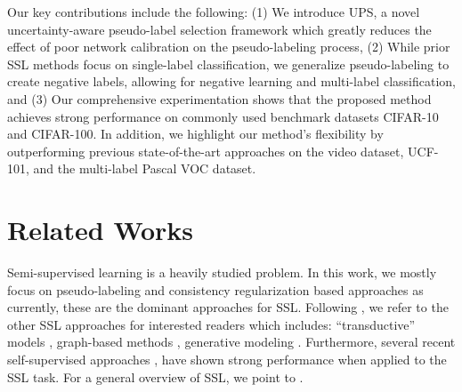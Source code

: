 \documentclass{article} \usepackage{iclr2021_conference,times}
\begin{document}
Our key contributions include the following: (1) We introduce UPS, a novel uncertainty-aware pseudo-label selection framework which greatly reduces the effect of poor network calibration on the pseudo-labeling process, (2) While prior SSL methods focus on single-label classification, we generalize pseudo-labeling to create negative labels, allowing for negative learning and multi-label classification, and (3) Our comprehensive experimentation shows that the proposed method achieves strong performance on commonly used benchmark datasets CIFAR-10 and CIFAR-100. In addition, we highlight our method's flexibility by outperforming previous state-of-the-art approaches on the video dataset, UCF-101, and the multi-label Pascal VOC dataset.  

\iffalse
Our key contributions include the following:
\begin{itemize}
  \item We introduce UPS, a novel uncertainty-aware pseudo-label selection framework which greatly reduces the effect of poor network calibration on the pseudo-labeling process.
  \item While prior SSL methods focus on single-label classification, we generalize pseudo-labeling to create negative labels, allowing for negative learning and multi-label classification.  
  \item Our comprehensive experimentation shows that the proposed method achieves strong performance on commonly used benchmark datasets CIFAR-10 and CIFAR-100. In addition, we highlight our method's flexibility by outperforming previous state-of-the-art approaches on the video dataset, UCF-101, and the multi-label Pascal VOC dataset.  
 \end{itemize}
 \fi
 


 






\section{Related Works}
Semi-supervised learning is a heavily studied problem. In this work, we mostly focus on pseudo-labeling and consistency regularization based approaches as currently, these are the dominant approaches for SSL. Following \citep{NIPS2019_8749_MixMatch}, we refer to the other SSL approaches for interested readers which includes: “transductive” models \citep{Gammerman1998Learning, joachims1999transductive, joachims2003transductive}, graph-based methods \citep{zhu2003semi, bengio200611, liu2019deep}, generative modeling \citep{belkin2002laplacian, lasserre2006principled, kingma2014semi, pu2016variational}. Furthermore, several recent self-supervised approaches \citep{grill2020bootstrap, chen2020big, caron2020unsupervised}, have shown strong performance when applied to the SSL task. For a general overview of SSL, we point to \citep{10.5555/semi-super, zhu2005semi}. 
\end{document}
